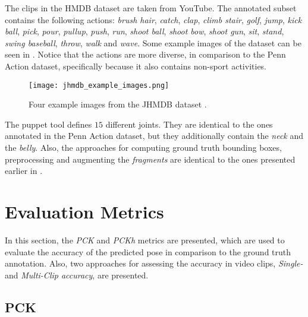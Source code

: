 The clips in the HMDB dataset are taken from YouTube.
The annotated subset contains the following actions:
\textit{brush hair}, \textit{catch}, \textit{clap}, \textit{climb stair}, \textit{golf}, \textit{jump}, \textit{kick ball}, \textit{pick}, \textit{pour}, \textit{pullup}, \textit{push}, \textit{run}, \textit{shoot ball}, \textit{shoot bow}, \textit{shoot gun}, \textit{sit}, \textit{stand}, \textit{swing baseball}, \textit{throw}, \textit{walk} and \textit{wave}.
Some example images of the dataset can be seen in .
Notice that the actions are more diverse, in comparison to the Penn Action dataset, specifically because it also contains non-sport activities.

\begin{figure}[htb!]
    \centering
    \texttt{[image: jhmdb\_example\_images.png]}
    \caption{Four example images from the JHMDB dataset \cite{jhuang_towards_2013}. }
    \label{fig:jhmdb_example_images}
\end{figure}

The puppet tool defines $15$ different joints.
They are identical to the ones annotated in the Penn Action dataset, but they additionally contain the \textit{neck} and the \textit{belly}.
Also, the approaches for computing ground truth bounding boxes, preprocessing and augmenting the \textit{fragments} are identical to the ones presented earlier in .

\section{Evaluation Metrics}
\label{sec:exp-metrics}
In this section, the \textit{PCK} and \textit{PCKh} metrics are presented, which are used to evaluate the accuracy of the predicted pose in comparison to the ground truth annotation.
Also, two approaches for assessing the accuracy in video clips, \textit{Single-} and \textit{Multi-Clip accuracy}, are presented.

\subsection{PCK}
\label{sec:exp-pck}

